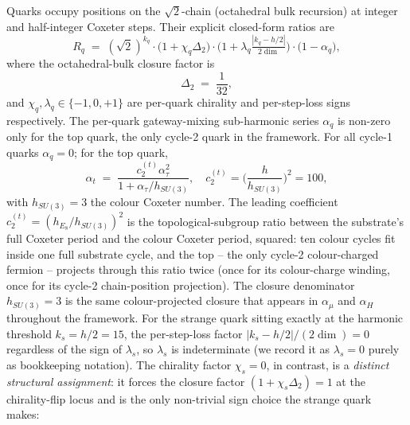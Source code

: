 ﻿\documentclass[reprint,amsmath,amssymb,aps,prd,longbibliography,floatfix]{revtex4-2}
\begin{document}
Quarks occupy positions on the $\sqrt{2}$-chain (octahedral bulk
recursion) at integer and half-integer Coxeter steps. Their explicit
closed-form ratios are
\begin{equation}
R_q \;=\; (\sqrt{2})^{k_q} \cdot \bigl(1 + \chi_q \Delta_2\bigr) \cdot \bigl(1 + \lambda_q \tfrac{|k_q - h/2|}{2\dim}\bigr) \cdot \bigl(1 - \alpha_q\bigr),
\label{eq:Rquark}
\end{equation}
where the octahedral-bulk closure factor is
\begin{equation}
\Delta_2 \;=\; \frac{1}{32},
\label{eq:Delta2}
\end{equation}
and $\chi_q, \lambda_q \in \{-1, 0, +1\}$ are per-quark
chirality and per-step-loss signs respectively. The per-quark
gateway-mixing sub-harmonic series $\alpha_q$ is non-zero only for the
top quark, the only cycle-2 quark in the framework. For all cycle-1
quarks $\alpha_q = 0$; for the top quark,
\begin{equation}
\alpha_t \;=\; \frac{c_2^{(t)} \alpha_\tau^2}{1 + \alpha_\tau / h_{SU(3)}},
\quad c_2^{(t)} = \biggl(\frac{h}{h_{SU(3)}}\biggr)^2 = 100,
\label{eq:alphat-derived}
\end{equation}
with $h_{SU(3)} = 3$ the colour Coxeter number. The leading coefficient
$c_2^{(t)} = (h_{E_8}/h_{SU(3)})^2$ is the topological-subgroup ratio
between the substrate's full Coxeter period and the colour Coxeter
period, squared: ten colour cycles fit inside one full substrate
cycle, and the top -- the only cycle-2 colour-charged fermion --
projects through this ratio twice (once for its colour-charge
winding, once for its cycle-2 chain-position projection). The
closure denominator $h_{SU(3)} = 3$ is the same colour-projected
closure that appears in $\alpha_\mu$ and $\alpha_H$ throughout the
framework. For the strange
quark sitting exactly at the harmonic threshold $k_s = h/2 = 15$,
the per-step-loss factor $|k_s - h/2|/(2\dim) = 0$ regardless of the
sign of $\lambda_s$, so $\lambda_s$ is indeterminate (we record it
as $\lambda_s = 0$ purely as bookkeeping notation). The chirality
factor $\chi_s = 0$, in contrast, is a \emph{distinct structural
assignment}: it forces the closure factor $(1 + \chi_s \Delta_2) =
1$ at the chirality-flip locus and is the only non-trivial sign
choice the strange quark makes:
\end{document}
